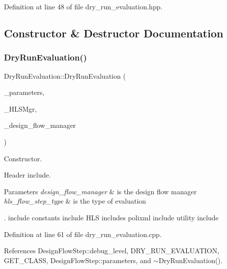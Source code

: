 Definition at line 48 of file dry\+\_\+run\+\_\+evaluation.\+hpp.



\subsection{Constructor \& Destructor Documentation}
\mbox{\label{classDryRunEvaluation_ac9aa5c40633fb63835bf19e5e10b74bc}} 
\subsubsection{\texorpdfstring{Dry\+Run\+Evaluation()}{DryRunEvaluation()}}
{\footnotesize\ttfamily Dry\+Run\+Evaluation\+::\+Dry\+Run\+Evaluation (\begin{DoxyParamCaption}\item[{const \hyperlink{Parameter_8hpp_a37841774a6fcb479b597fdf8955eb4ea}{Parameter\+Const\+Ref}}]{\+\_\+parameters,  }\item[{const \hyperlink{hls__manager_8hpp_acd3842b8589fe52c08fc0b2fcc813bfe}{H\+L\+S\+\_\+manager\+Ref}}]{\+\_\+\+H\+L\+S\+Mgr,  }\item[{const Design\+Flow\+Manager\+Const\+Ref}]{\+\_\+design\+\_\+flow\+\_\+manager }\end{DoxyParamCaption})}



Constructor. 

Header include.


\begin{DoxyParams}{Parameters}
{\em design\+\_\+flow\+\_\+manager} & is the design flow manager \\
\hline
{\em hls\+\_\+flow\+\_\+step\+\_\+type} & is the type of evaluation\\
\hline
\end{DoxyParams}
. include constants include H\+LS includes polixml include utility include 

Definition at line 61 of file dry\+\_\+run\+\_\+evaluation.\+cpp.



References Design\+Flow\+Step\+::debug\+\_\+level, D\+R\+Y\+\_\+\+R\+U\+N\+\_\+\+E\+V\+A\+L\+U\+A\+T\+I\+ON, G\+E\+T\+\_\+\+C\+L\+A\+SS, Design\+Flow\+Step\+::parameters, and $\sim$\+Dry\+Run\+Evaluation().

